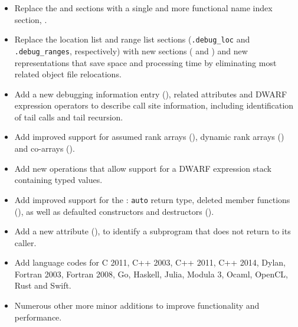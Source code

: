 \begin{itemize}
\item Replace the \dotdebugpubnames{} and \dotdebugpubtypes{} sections
with a single and more functional name index section, \dotdebugnames{}.
\bb
\item Replace the location list and range list sections (\texttt{.debug\_loc} 
and \texttt{.debug\_ranges}, respectively) with new sections (\dotdebugloclists{} 
and \dotdebugrnglists) and new representations that
save space and processing time by eliminating most related
object file relocations.
\eb
\item Add a new debugging information entry (\DWTAGcallsiteNAME), related 
attributes and DWARF expression operators to describe call site information, 
including identification of tail calls and tail recursion.
\item Add improved support for  assumed rank arrays 
(\DWTAGgenericsubrangeNAME), dynamic rank arrays (\DWATrankNAME)
and co-arrays (\DWTAGcoarraytypeNAME{}).
\item Add new operations that allow support for 
a DWARF expression stack containing typed values.
\item Add improved support for the :
\texttt{auto} return type, deleted member functions (\DWATdeletedNAME), 
as well as defaulted constructors and destructors (\DWATdefaultedNAME).
\item Add a new attribute (\DWATnoreturnNAME{}), to identify 
a subprogram that does not return to its caller.
\item Add language codes for C 2011, C++ 2003, C++ 2011, C++ 2014,
Dylan, Fortran 2003, Fortran 2008, Go, Haskell, 
Julia, Modula 3, Ocaml, OpenCL, Rust and Swift.
\item Numerous other more minor additions to improve functionality
and performance.
\end{itemize}

